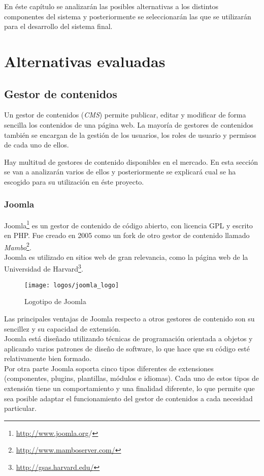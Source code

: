 En éste capítulo se analizarán las posibles alternativas a los distintos componentes del sistema y posteriormente se seleccionarán las que se utilizarán para el desarrollo del sistema final.

\section{Alternativas evaluadas}

\subsection{Gestor de contenidos}
Un gestor de contenidos (\textit{CMS}) permite publicar, editar y modificar de forma sencilla los contenidos de una página web.  La mayoría de gestores de contenidos también se encargan de la gestión de los usuarios, los roles de usuario y permisos de cada uno de ellos.

Hay multitud de gestores de contenido disponibles en el mercado. En esta sección se van a analizarán varios de ellos y posteriormente se explicará cual se ha escogido para su utilización en éste proyecto.


\subsubsection{Joomla}
Joomla\footnote{\url{http://www.joomla.org}/} es un gestor de contenido de código abierto, con licencia GPL y escrito en PHP.  Fue creado en 2005 como un fork de otro gestor de contenido llamado \textit{Mambo}\footnote{\url{http://www.mamboserver.com/}}.\\
Joomla es utilizado en sitios web de gran relevancia, como la página web de la Universidad de Harvard\footnote{\url{http://gsas.harvard.edu/}}.

\begin{figure}[h]
\centering
\texttt{[image: logos/joomla\_logo]}
\caption{Logotipo de Joomla}
\end{figure}

Las principales ventajas de Joomla respecto a otros gestores de contenido son su sencillez y su capacidad de extensión.\\
Joomla está diseñado utilizando técnicas de programación orientada a objetos y aplicando varios patrones de diseño de software, lo que hace que su código esté relativamente bien formado.\\
Por otra parte Joomla soporta cinco tipos diferentes de extensiones (componentes, plugins, plantillas, módulos e idiomas).  Cada uno de estos tipos de extensión tiene un comportamiento y una finalidad diferente, lo que permite que sea posible adaptar el funcionamiento del gestor de contenidos a cada necesidad particular.


